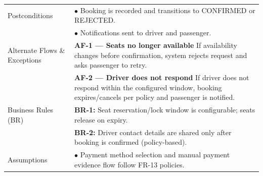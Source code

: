 \begin{longtable}{|>{\raggedright\arraybackslash}p{4cm}|>{\raggedright\arraybackslash}p{11cm}|}
\hline
Postconditions & $\bullet$ Booking is recorded and transitions to CONFIRMED or REJECTED. \\
& $\bullet$ Notifications sent to driver and passenger. \\
\hline
Alternate Flows \& Exceptions & \textbf{AF-1 — Seats no longer available} \newline If availability changes before confirmation, system rejects request and asks passenger to retry. \\
& \textbf{AF-2 — Driver does not respond} \newline If driver does not respond within the configured window, booking expires/cancels per policy and passenger is notified. \\
\hline
Business Rules (BR) & \textbf{BR-1:} Seat reservation/lock window is configurable; seats release on expiry. \\
& \textbf{BR-2:} Driver contact details are shared only after booking is confirmed (policy-based). \\
\hline
Assumptions & $\bullet$ Payment method selection and manual payment evidence flow follow FR-13 policies. \\
\end{longtable}

